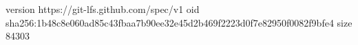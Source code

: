 version https://git-lfs.github.com/spec/v1
oid sha256:1b48c8e060ad85c43fbaa7b90ee32e45d2b469f2223d0f7e82950f0082f9bfe4
size 84303
